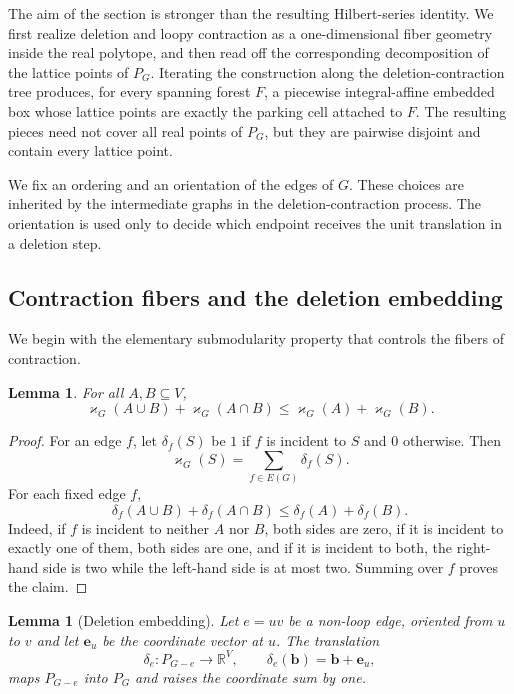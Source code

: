 \documentclass[11pt]{article}
\theoremstyle{plain}
\newtheorem{lemma}[theorem]{Lemma}
\theoremstyle{definition}
\newcommand{\bb}{\mathbf{b}}
\newcommand{\be}{\mathbf{e}}
\newcommand{\kp}{\varkappa}
\newcommand{\RR}{\mathbb R}
\numberwithin{equation}{section}
\begin{document}
The aim of the section is stronger than the resulting Hilbert-series identity.
We first realize deletion and loopy contraction as a one-dimensional fiber
geometry inside the real polytope, and then read off the corresponding
decomposition of the lattice points of $P_G$.  Iterating the
construction along the deletion-contraction tree produces, for every spanning
forest $F$, a piecewise integral-affine embedded box whose lattice points are
exactly the parking cell attached to $F$.  The resulting pieces need not cover
all real points of $P_G$, but they are pairwise disjoint and contain every
lattice point.

We fix an ordering and an orientation of
the edges of $G$.  These choices are inherited by the intermediate graphs in
the deletion-contraction process.  The orientation is used only to decide
which endpoint receives the unit translation in a deletion step.

\subsection{Contraction fibers and the deletion embedding}
\label{subsec:contraction-fibers}

We begin with the elementary submodularity property that controls the fibers of
contraction.

\begin{lemma}\label{lem:kappa-submodular}
For all $A,B\subseteq V$,
\[
 \kp_G(A\cup B)+\kp_G(A\cap B)
 \le \kp_G(A)+\kp_G(B).
\]
\end{lemma}

\begin{proof}
For an edge $f$, let $\delta_f(S)$ be $1$ if $f$ is incident to $S$ and $0$
otherwise.  Then
\[
   \kp_G(S)=\sum_{f\in E(G)}\delta_f(S).
\]
For each fixed edge $f$,
\[
 \delta_f(A\cup B)+\delta_f(A\cap B)
 \le \delta_f(A)+\delta_f(B).
\]
Indeed, if $f$ is incident to neither $A$ nor $B$, both sides are zero, if it
is incident to exactly one of them, both sides are one, and if it is incident to both,
the right-hand side is two while the left-hand side is at most two.
Summing over $f$ proves the claim.
\end{proof}

\begin{lemma}[Deletion embedding]\label{lem:deletion-embedding}
  Let $e=uv$ be a non-loop edge, oriented from $u$ to $v$ and
let $\be_u$ be the coordinate vector at $u$.
%
The translation
\[
   \delta_e:P_{G-e}\longrightarrow\RR^V,
   \qquad
   \delta_e(\bb)=\bb+\be_u,
\]
maps $P_{G-e}$ into $P_G$ and raises the coordinate sum by one.
\end{lemma}
\end{document}
